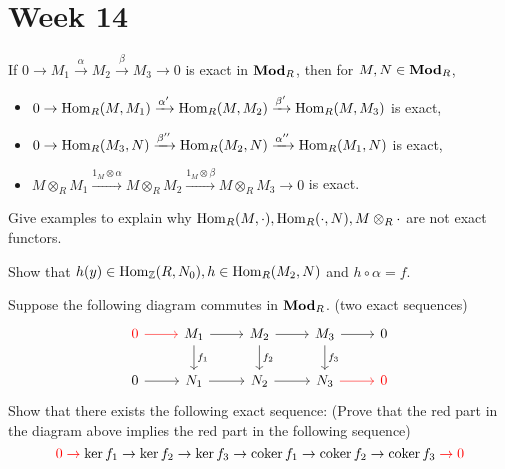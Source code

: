 
\section{Week 14}

\begin{exercise}
  If $0 \to M_1 \xrightarrow{\alpha} M_2 \xrightarrow{\beta} M_3 \to 0$
  is exact in $\mathbf{Mod}_R$, then for $M, N \in \mathbf{Mod}_R$,
  \begin{itemize}
    \item $0 \to \operatorname{Hom}_R(M, M_1) \xrightarrow{\alpha'}
      \operatorname{Hom}_R(M, M_2) \xrightarrow{\beta'} \operatorname{Hom}_R(M, M_3)$ is exact,
    \item $0 \to \operatorname{Hom}_R(M_3, N) \xrightarrow{\beta''}
      \operatorname{Hom}_R(M_2, N) \xrightarrow{\alpha''} \operatorname{Hom}_R(M_1, N)$ is exact,
    \item $M \otimes_R M_1 \xrightarrow{1_M \otimes \alpha}
      M\otimes_R M_2 \xrightarrow{1_M \otimes \beta} M\otimes_R M_3 \to 0$ is exact.
  \end{itemize}
\end{exercise}

\begin{exercise}
  Give examples to explain why $\operatorname{Hom}_R(M, \cdot), \operatorname{Hom}_R(\cdot, N), M\otimes_R \cdot$
  are not exact functors.
\end{exercise}

\begin{exercise}
  Show that $h(y) \in \operatorname{Hom}_{\mathbb{Z}}(R, N_0), h \in \operatorname{Hom}_R(M_2, N)$ and $h \circ \alpha = f$.
\end{exercise}

\begin{exercise}
  Suppose the following diagram commutes in $\mathbf{Mod}_R$.
  (two exact sequences)
  \[
    \begin{tikzcd}
      {\color{red} 0} \ar[r, red] & M_1 \ar[r] \ar[d, "f_1"]
      & M_2 \ar[r] \ar[d, "f_2"] & M_3 \ar[r] \ar[d, "f_3"] & 0 \\
      0 \ar[r] & N_1 \ar[r] & N_2 \ar[r] & N_3 \ar[r, red] & {\color{red} 0}
    \end{tikzcd}
  \]
  Show that there exists the following exact sequence:
  (Prove that the red part in the diagram above implies the red part in
  the following sequence)
  \[
    \mathcolor{red}{0 \to} \ker f_1 \to \ker f_2 \to \ker f_3
    \to \coker f_1 \to \coker f_2 \to \coker f_3 \mathcolor{red}{\to 0}
  \]
\end{exercise}

